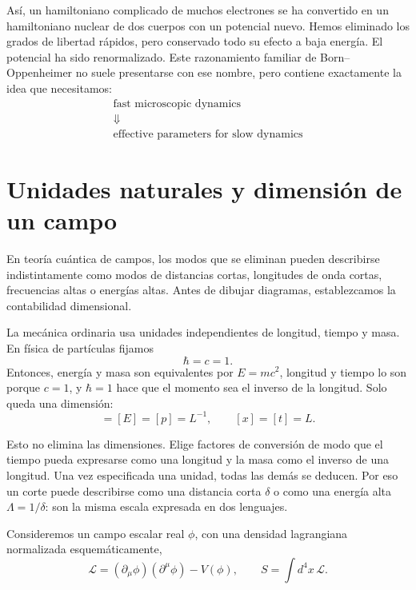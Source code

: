 Así, un hamiltoniano complicado de muchos electrones se ha convertido en un hamiltoniano nuclear de dos cuerpos con un potencial nuevo. Hemos eliminado los grados de libertad rápidos, pero conservado todo su efecto a baja energía. El potencial ha sido renormalizado. Este razonamiento familiar de Born--Oppenheimer no suele presentarse con ese nombre, pero contiene exactamente la idea que necesitamos:
\begin{equation}
\begin{gathered}
\text{fast microscopic dynamics}\\
\Downarrow\\
\text{effective parameters for slow dynamics}
\end{gathered}
\end{equation}

\section{Unidades naturales y dimensión de un campo}

En teoría cuántica de campos, los modos que se eliminan pueden describirse indistintamente como modos de distancias cortas, longitudes de onda cortas, frecuencias altas o energías altas. Antes de dibujar diagramas, establezcamos la contabilidad dimensional.

La mecánica ordinaria usa unidades independientes de longitud, tiempo y masa. En física de partículas fijamos
\begin{equation}
\hbar=c=1.
\end{equation}
Entonces, energía y masa son equivalentes por \(E=mc^2\), longitud y tiempo lo son porque \(c=1\), y \(\hbar=1\) hace que el momento sea el inverso de la longitud. Solo queda una dimensión:
\begin{equation}
[M]=[E]=[p]=L^{-1},
\qquad
[x]=[t]=L.
\label{eq:natural-units}
\end{equation}

Esto no elimina las dimensiones. Elige factores de conversión de modo que el tiempo pueda expresarse como una longitud y la masa como el inverso de una longitud. Una vez especificada una unidad, todas las demás se deducen. Por eso un corte puede describirse como una distancia corta \(\delta\) o como una energía alta \(\Lambda=1/\delta\): son la misma escala expresada en dos lenguajes.

Consideremos un campo escalar real \(\phi\), con una densidad lagrangiana normalizada esquemáticamente,
\begin{equation}
\mathcal L=(\partial_\mu\phi)(\partial^\mu\phi)-V(\phi),
\qquad
S=\int d^4x\,\mathcal L.
\label{eq:scalar-action}
\end{equation}

